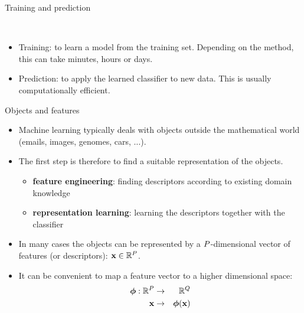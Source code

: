 \documentclass[xcolor=pdftex,dvipsnames,table]{beamer}
\begin{document}
\begin{frame}{Training and prediction}
\begin{figure}[htb]
  \centering
  \\  
\end{figure}
\begin{itemize}
\item Training: to learn a model from the training set. Depending on the method, this can take minutes, hours or days.
\item Prediction: to apply the learned classifier to new data. This is usually computationally efficient. 
\end{itemize}
\end{frame}

\begin{frame}{Objects and features}
\begin{itemize}
\item Machine learning typically deals with objects outside the mathematical world (emails, images, genomes, cars, $\ldots$).
\item The first step is therefore to find a suitable representation of the objects. 
\begin{itemize}
\item \textbf{feature engineering}: finding descriptors according to existing domain knowledge
\item \textbf{representation learning}: learning the descriptors together with the classifier
\end{itemize}
\item In many cases the objects can be represented by a $P$-dimensional vector of features (or descriptors): $\mathbf{x} \in \mathbb{R}^{P}$. 
\item It can be convenient to map a feature vector to a higher dimensional space:
\begin{eqnarray}
\boldsymbol{\phi} : \mathbb{R}^{P} &\rightarrow & \mathbb{R}^Q \\
\mathbf{x} &\rightarrow &\boldsymbol{\phi} (\mathbf{x})
\end{eqnarray}
\end{itemize}
\end{frame}
\end{document}
